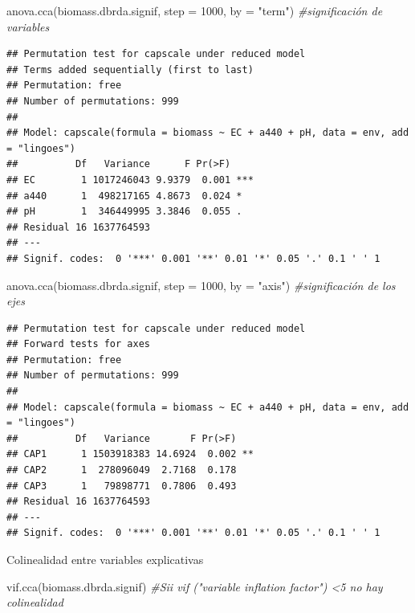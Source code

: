 \documentclass[
]{book}
\newenvironment{Shaded}{\begin{snugshade}}{\end{snugshade}}
\newcommand{\AttributeTok}[1]{\textcolor[rgb]{0.77,0.63,0.00}{#1}}
\newcommand{\CommentTok}[1]{\textcolor[rgb]{0.56,0.35,0.01}{\textit{#1}}}
\newcommand{\DecValTok}[1]{\textcolor[rgb]{0.00,0.00,0.81}{#1}}
\newcommand{\FunctionTok}[1]{\textcolor[rgb]{0.00,0.00,0.00}{#1}}
\newcommand{\NormalTok}[1]{#1}
\newcommand{\StringTok}[1]{\textcolor[rgb]{0.31,0.60,0.02}{#1}}
\begin{document}
\begin{Shaded}
\begin{Highlighting}[]
\FunctionTok{anova.cca}\NormalTok{(biomass.dbrda.signif, }\AttributeTok{step =} \DecValTok{1000}\NormalTok{, }\AttributeTok{by =} \StringTok{"term"}\NormalTok{) }\CommentTok{\#significación de variables }
\end{Highlighting}
\end{Shaded}

\begin{verbatim}
## Permutation test for capscale under reduced model
## Terms added sequentially (first to last)
## Permutation: free
## Number of permutations: 999
## 
## Model: capscale(formula = biomass ~ EC + a440 + pH, data = env, add = "lingoes")
##          Df   Variance      F Pr(>F)    
## EC        1 1017246043 9.9379  0.001 ***
## a440      1  498217165 4.8673  0.024 *  
## pH        1  346449995 3.3846  0.055 .  
## Residual 16 1637764593                  
## ---
## Signif. codes:  0 '***' 0.001 '**' 0.01 '*' 0.05 '.' 0.1 ' ' 1
\end{verbatim}

\begin{Shaded}
\begin{Highlighting}[]
\FunctionTok{anova.cca}\NormalTok{(biomass.dbrda.signif, }\AttributeTok{step =} \DecValTok{1000}\NormalTok{, }\AttributeTok{by =} \StringTok{"axis"}\NormalTok{) }\CommentTok{\#significación de los ejes}
\end{Highlighting}
\end{Shaded}

\begin{verbatim}
## Permutation test for capscale under reduced model
## Forward tests for axes
## Permutation: free
## Number of permutations: 999
## 
## Model: capscale(formula = biomass ~ EC + a440 + pH, data = env, add = "lingoes")
##          Df   Variance       F Pr(>F)   
## CAP1      1 1503918383 14.6924  0.002 **
## CAP2      1  278096049  2.7168  0.178   
## CAP3      1   79898771  0.7806  0.493   
## Residual 16 1637764593                  
## ---
## Signif. codes:  0 '***' 0.001 '**' 0.01 '*' 0.05 '.' 0.1 ' ' 1
\end{verbatim}

Colinealidad entre variables explicativas

\begin{Shaded}
\begin{Highlighting}[]
\FunctionTok{vif.cca}\NormalTok{(biomass.dbrda.signif) }\CommentTok{\#Sii vif ("variable inflation factor") \textless{}5 no hay colinealidad}
\end{Highlighting}
\end{Shaded}
\end{document}
